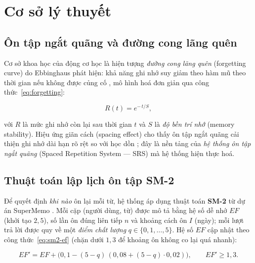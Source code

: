 \section{Cơ sở lý thuyết}
\label{sec:co-so-ly-thuyet}

\subsection{Ôn tập ngắt quãng và đường cong lãng quên}
\label{subsec:srs-theory}

Cơ sở khoa học của động cơ học là hiện tượng \textit{đường cong lãng quên}
(forgetting curve) do Ebbinghaus phát hiện: khả năng ghi nhớ suy giảm theo
hàm mũ theo thời gian nếu không được củng cố \cite{ebbinghaus1913memory},
mô hình hoá đơn giản qua công thức~\eqref{eq:forgetting}:

\begin{equation}
  \label{eq:forgetting}
  R(t) = e^{-\,t/S},
\end{equation}

với \( R \) là mức ghi nhớ còn lại sau thời gian \( t \) và \( S \) là
\textit{độ bền trí nhớ} (memory stability). Hiệu ứng giãn cách (spacing
effect) cho thấy ôn tập ngắt quãng cải thiện ghi nhớ dài hạn rõ rệt so với
học dồn \cite{cepeda2006distributed}; đây là nền tảng của \textit{hệ thống
ôn tập ngắt quãng} (Spaced Repetition System --- SRS) mà hệ thống hiện thực
hoá.

\subsection{Thuật toán lập lịch ôn tập SM-2}
\label{subsec:sm2-theory}

Để quyết định \textit{khi nào} ôn lại mỗi từ, hệ thống áp dụng thuật toán
\textbf{SM-2} từ dự án SuperMemo \cite{wozniak1990optimization}. Mỗi cặp
(người dùng, từ) được mô tả bằng hệ số dễ nhớ \( EF \) (khởi tạo \( 2{,}5 \)),
số lần ôn đúng liên tiếp \( n \) và khoảng cách ôn \( I \) (ngày); mỗi lượt
trả lời được quy về một \textit{điểm chất lượng} \( q \in \{0,1,\dots,5\} \).
Hệ số \( EF \) cập nhật theo công thức~\eqref{eq:sm2-ef} (chặn dưới
\( 1{,}3 \) để khoảng ôn không co lại quá nhanh):

\begin{equation}
  \label{eq:sm2-ef}
  EF' = EF + \big(0{,}1 - (5-q)\,(0{,}08 + (5-q)\cdot 0{,}02)\big),
  \qquad EF' \geq 1{,}3 .
\end{equation}

